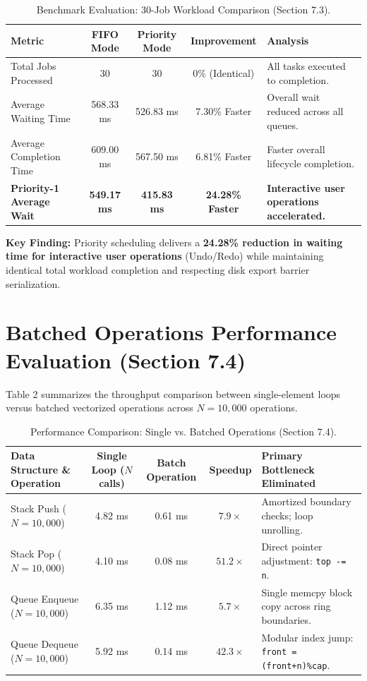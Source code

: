 \documentclass[10pt,a4paper]{article}
\begin{document}
\begin{table}[h!]
\centering
\small
\begin{tabularx}{\textwidth}{l c c c X}
\toprule
\textbf{Metric} & \textbf{FIFO Mode} & \textbf{Priority Mode} & \textbf{Improvement} & \textbf{Analysis} \\
\midrule
Total Jobs Processed & 30 & 30 & 0\% (Identical) & All tasks executed to completion. \\
Average Waiting Time & 568.33 ms & 526.83 ms & 7.30\% Faster & Overall wait reduced across all queues. \\
Average Completion Time & 609.00 ms & 567.50 ms & 6.81\% Faster & Faster overall lifecycle completion. \\
\textbf{Priority-1 Average Wait} & \textbf{549.17 ms} & \textbf{415.83 ms} & \textbf{24.28\% Faster} & \textbf{Interactive user operations accelerated.} \\
\bottomrule
\end{tabularx}
\caption{Benchmark Evaluation: 30-Job Workload Comparison (Section 7.3).}
\end{table}

\textbf{Key Finding:} Priority scheduling delivers a \textbf{24.28\% reduction in waiting time for interactive user operations} (Undo/Redo) while maintaining identical total workload completion and respecting disk export barrier serialization.

\section{Batched Operations Performance Evaluation (Section 7.4)}
Table 2 summarizes the throughput comparison between single-element loops versus batched vectorized operations across $N = 10,000$ operations.

\begin{table}[h!]
\centering
\small
\begin{tabularx}{\textwidth}{l c c c X}
\toprule
\textbf{Data Structure \& Operation} & \textbf{Single Loop ($N$ calls)} & \textbf{Batch Operation} & \textbf{Speedup} & \textbf{Primary Bottleneck Eliminated} \\
\midrule
Stack Push ($N=10,000$) & 4.82 ms & 0.61 ms & $7.9\times$ & Amortized boundary checks; loop unrolling. \\
Stack Pop ($N=10,000$) & 4.10 ms & 0.08 ms & $51.2\times$ & Direct pointer adjustment: \texttt{top -= n}. \\
Queue Enqueue ($N=10,000$) & 6.35 ms & 1.12 ms & $5.7\times$ & Single memcpy block copy across ring boundaries. \\
Queue Dequeue ($N=10,000$) & 5.92 ms & 0.14 ms & $42.3\times$ & Modular index jump: \texttt{front = (front+n)\%cap}. \\
\bottomrule
\end{tabularx}
\caption{Performance Comparison: Single vs. Batched Operations (Section 7.4).}
\end{table}
\end{document}
